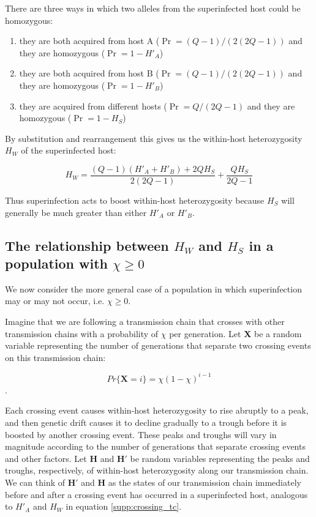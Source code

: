 \documentclass[_main.tex]{subfiles}
\begin{document}
There are three ways in which two alleles from the superinfected host could be homozygous:

\begin{enumerate}

\item they are both acquired from host A ($ \Pr = (Q-1)/(2(2Q-1))$ and they are homozygous ($ \Pr = 1- H'_A$)

\item they are both acquired from host B ($ \Pr = (Q-1)/(2(2Q-1))$ and they are homozygous ($ \Pr = 1- H'_B$)

\item they are acquired from different hosts ($ \Pr = Q / (2Q-1)$ and they are homozygous ($ \Pr = 1- H_S$)

\end{enumerate}

By substitution and rearrangement this gives us the within-host heterozygosity $H_W$ of the superinfected host:

\begin{equation}
H_W =
\frac{(Q-1) (H'_A + H'_B) + 2 Q H_S}{2(2Q-1)}
+ \frac{Q H_S}{2Q-1}
\label{supp:crossing_tc}
\end{equation}

Thus superinfection acts to boost within-host heterozygosity because $H_S$ will generally be much greater than either $H'_A$ or $H'_B$.  

\subsection{The relationship between $H_W$ and $H_S$ in a population with $\chi \geq 0$}
\label{derive_hwhs_1}

We now consider the more general case of a population in which superinfection may or may not occur, i.e. $\chi \geq 0$.  

Imagine that we are following a transmission chain that crosses with other transmission chains with a probability of $\chi$ per generation.  Let \textbf{X} be a random variable representing the number of generations that separate two crossing events on this transmission chain: 

\begin{equation}
Pr \{ \textbf{X} = i \} = \chi (1- \chi)^{i-1}
\label{eq:supp_xprobdist}
\end{equation}.

Each crossing event causes within-host heterozygosity to rise abruptly to a peak, and then genetic drift causes it to decline gradually to a trough before it is boosted by another crossing event.  These peaks and troughs will vary in magnitude according to the number of generations that separate crossing events and other factors.  Let $\mathbf{H}$ and  $\mathbf{H'}$ be random variables representing the peaks and troughs, respectively, of within-host heterozygosity along our transmission chain.  We can think of $\mathbf{H'}$ and $\mathbf{H}$ as the states of our transmission chain immediately before and after a crossing event has occurred in a superinfected host, analogous to $H'_A$ and $H_W$ in equation \ref{supp:crossing_tc}.
\end{document}
